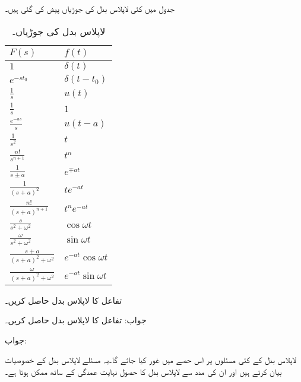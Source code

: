 جدول  میں کئی لاپلاس بدل کی جوڑیاں پیش کی گئی ہیں۔
\begin{table}
\caption{لاپلاس بدل کی جوڑیاں۔}
\label{جدول_لاپلاس_بدل_جوڑیاں}
\centering
\begin{tabular}{l l}
$F(s)$&$f(t)$\Bstrut \\
\hline 
$1$&$\delta(t)$ \Tstrut \\
$e^{-s t_0}$&$\delta(t-t_0)$ \\[2ex] 
$\frac{1}{s}$&$u(t)$ \\[2ex] 
$\frac{1}{s}$&$1$ \\[2ex] 
$\frac{e^{-as}}{s}$&$u(t-a)$ \\[2ex] 
$\frac{1}{s^2}$&$t$ \\[2ex] 
$\frac{n!}{s^{n+1}}$&$t^n$ \\[2ex] 
$\frac{1}{s\pm a}$&$e^{\mp at}$ \\[2ex] 
$\frac{1}{(s+a)^2}$&$te^{-at}$ \\[2ex] 
$\frac{n!}{(s+a)^{n+1}}$&$t^n e^{-at}$ \\[2ex] 
$\frac{s}{s^2+\omega^2}$&$\cos \omega t$ \\[2ex] 
$\frac{\omega}{s^2+\omega^2}$&$\sin \omega t$ \\[2ex] 
$\frac{s+a}{(s+a)^2+\omega^2}$&$e^{-at} \cos \omega t$ \\[2ex] 
$\frac{\omega}{(s+a)^2+\omega^2}$&$e^{-at} \sin \omega t$ 
\end{tabular}
\end{table}

تفاعل  کا لاپلاس بدل حاصل کریں۔

جواب:
تفاعل  کا لاپلاس بدل حاصل کریں۔

جواب:

لاپلاس بدل کے کئی مسئلوں پر اس حصے میں غور کیا جائے گا۔یہ مسئلے لاپلاس بدل کے خصوصیات بیان کرتے ہیں اور ان کی مدد سے لاپلاس بدل کا حصول نہایت عمدگی کے ساتھ ممکن ہوتا ہے۔

